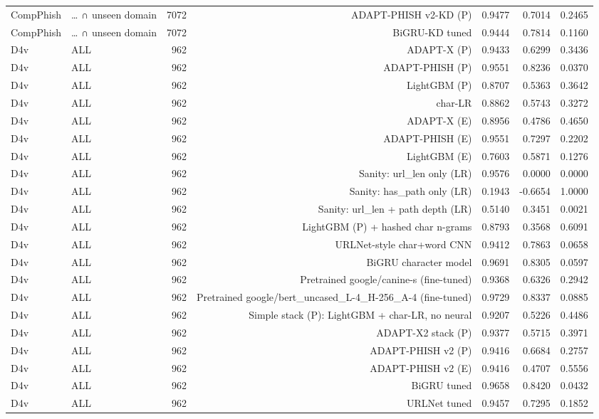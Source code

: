 \begin{table}[t]
\begin{tabular}{llrrrrr}
CompPhish & … ∩ unseen domain & 7072 & ADAPT-PHISH v2-KD (P) & 0.9477 & 0.7014 & 0.2465 \\
CompPhish & … ∩ unseen domain & 7072 & BiGRU-KD tuned & 0.9444 & 0.7814 & 0.1160 \\
D4v & ALL & 962 & ADAPT-X (P) & 0.9433 & 0.6299 & 0.3436 \\
D4v & ALL & 962 & ADAPT-PHISH (P) & 0.9551 & 0.8236 & 0.0370 \\
D4v & ALL & 962 & LightGBM (P) & 0.8707 & 0.5363 & 0.3642 \\
D4v & ALL & 962 & char-LR & 0.8862 & 0.5743 & 0.3272 \\
D4v & ALL & 962 & ADAPT-X (E) & 0.8956 & 0.4786 & 0.4650 \\
D4v & ALL & 962 & ADAPT-PHISH (E) & 0.9551 & 0.7297 & 0.2202 \\
D4v & ALL & 962 & LightGBM (E) & 0.7603 & 0.5871 & 0.1276 \\
D4v & ALL & 962 & Sanity: url\_len only (LR) & 0.9576 & 0.0000 & 0.0000 \\
D4v & ALL & 962 & Sanity: has\_path only (LR) & 0.1943 & -0.6654 & 1.0000 \\
D4v & ALL & 962 & Sanity: url\_len + path depth (LR) & 0.5140 & 0.3451 & 0.0021 \\
D4v & ALL & 962 & LightGBM (P) + hashed char n-grams & 0.8793 & 0.3568 & 0.6091 \\
D4v & ALL & 962 & URLNet-style char+word CNN & 0.9412 & 0.7863 & 0.0658 \\
D4v & ALL & 962 & BiGRU character model & 0.9691 & 0.8305 & 0.0597 \\
D4v & ALL & 962 & Pretrained google/canine-s (fine-tuned) & 0.9368 & 0.6326 & 0.2942 \\
D4v & ALL & 962 & Pretrained google/bert\_uncased\_L-4\_H-256\_A-4 (fine-tuned) & 0.9729 & 0.8337 & 0.0885 \\
D4v & ALL & 962 & Simple stack (P): LightGBM + char-LR, no neural & 0.9207 & 0.5226 & 0.4486 \\
D4v & ALL & 962 & ADAPT-X2 stack (P) & 0.9377 & 0.5715 & 0.3971 \\
D4v & ALL & 962 & ADAPT-PHISH v2 (P) & 0.9416 & 0.6684 & 0.2757 \\
D4v & ALL & 962 & ADAPT-PHISH v2 (E) & 0.9416 & 0.4707 & 0.5556 \\
D4v & ALL & 962 & BiGRU tuned & 0.9658 & 0.8420 & 0.0432 \\
D4v & ALL & 962 & URLNet tuned & 0.9457 & 0.7295 & 0.1852 \\

\end{tabular}
\end{table}
